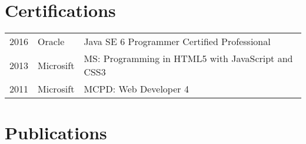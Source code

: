 \documentclass[]{resume}
\begin{document}
\begin{minipage}[t]{0.66\textwidth}

\section{Certifications} 
\begin{tabular}{rll}
2016 & Oracle & Java SE 6 Programmer Certified Professional \\
2013 & Microsift & MS: Programming in HTML5 with JavaScript and CSS3 \\
2011 & Microsift & MCPD: Web Developer 4 \\
\end{tabular}
\sectionsep


\section{Publications} 
\sectionsep
\sectionsep


\nocite{*}

\end{minipage} 
\end{document}
